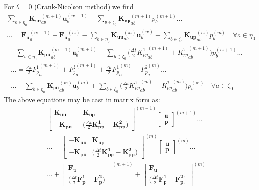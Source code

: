 \documentclass[11pt]{article} %
\begin{document}
For $\theta = 0$ (Crank-Nicolson method) we find
\begin{eqnarray}
	\sum_{b \in \eta_0} \mathbf{K_{uu}}_{ab}^{(m+1)} \mathbf{u}_b^{(m+1)} - \sum_{b \in \zeta_0} \mathbf{K_{up}}_{ab}^{(m+1)} p_b^{(m+1)} ... \qquad \qquad \nonumber \\
	... = \mathbf{F_{u}}_{a}^{(m+1)} + \mathbf{F_{u}}_{a}^{(m)} - \sum_{b \in \eta_0} \mathbf{K_{uu}}_{ab}^{(m)} \mathbf{u}_b^{(m)} + \sum_{b \in \zeta_0} \mathbf{K_{up}}_{ab}^{(m)} p_b^{(m)} \quad \forall a \in \eta_0
\end{eqnarray}
\begin{eqnarray}
	 - \sum_{b \in \eta_0} \mathbf{K_{pu}}_{ab}^{(m+1)} \mathbf{u}_b^{(m+1)} - \sum_{b \in \zeta_0} \bigg( \frac{\Delta t}{2} {K^1_{pp}}_{ab}^{(m+1)} + {K^2_{pp}}_{ab}^{(m+1)} \bigg) p_b^{(m+1)}  ... \nonumber \\
	... = \frac{\Delta t}{2} {F^1_{p}}_{a}^{(m+1)} + {F^2_{p}}_{a}^{(m+1)} + \frac{\Delta t}{2} {F^1_{p}}_{a}^{(m)} - {F^2_{p}}_{a}^{(m)} ... \nonumber \\
	... - \sum_{b \in \eta_0} \mathbf{K_{pu}}_{ab}^{(m)} \mathbf{u}_b^{(m)} + \sum_{b \in \zeta_0} \bigg( \frac{\Delta t}{2} {K^1_{pp}}_{ab}^{(m)} - {K^2_{pp}}_{ab}^{(m)} \bigg) p_b^{(m)} \quad \forall a \in \zeta_0
\end{eqnarray}
The above equations may be cast in matrix form as:
\begin{eqnarray}
	\left[
	\begin{array}{cc}
		\mathbf{K_{uu}} & -\mathbf{K_{up}} \\
		-\mathbf{K_{pu}} & -\bigg( \frac{\Delta t}{2} \mathbf{K^1_{pp}} + \mathbf{K^2_{pp}} \bigg)
	\end{array} \right] ^{(m+1)}
	\left[
	\begin{array}{c}
		\mathbf{u} \\
		\mathbf{p}
	\end{array} \right] ^{(m+1)} ... \nonumber \\
	... = \left[
	\begin{array}{cc}
		-\mathbf{K_{uu}} & \mathbf{K_{up}} \\
		-\mathbf{K_{pu}} & \bigg( \frac{\Delta t}{2} \mathbf{K^1_{pp}} - \mathbf{K^2_{pp}} \bigg)
	\end{array} \right] ^{(m)}
	\left[
	\begin{array}{c}
		\mathbf{u} \\
		\mathbf{p}
	\end{array} \right] ^{(m)} ... \nonumber \\
	... + \left[
	\begin{array}{c}
		\mathbf{F_u} \\
		 \bigg( \frac{\Delta t}{2} \mathbf{F^1_{p}} + \mathbf{F^2_{p}} \bigg)
	\end{array} \right] ^{(m+1)} +
	\left[
	\begin{array}{c}
		\mathbf{F_u} \\
		 \bigg( \frac{\Delta t}{2} \mathbf{F^1_{p}} - \mathbf{F^2_{p}} \bigg)
	\end{array} \right] ^{(m)}
\end{eqnarray}
\end{document}
